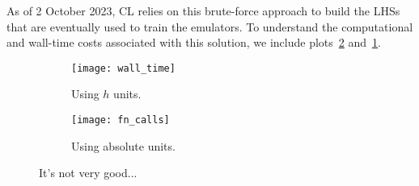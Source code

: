 \begin{comment}
The \verb|cdist| function can be re-used to compare LHSs loaded from 
different
files. However, since there is generally little reason to keep old LHSs
(except, perhaps, to reconstruct specific emulators), it reduces clutter to
simply continue overwriting the same file. Therefore, the function
\verb|multithread_unit_LHC_builder| also includes a parameter
\verb|previous_record|, which is recommended whenever the user would like to
stop the function and then resume it later. In such a case, the parameter
should be set to the \verb|cdist| value of the exis}
\end{comment}



As of 2 October 2023, CL relies on this brute-force approach to build the
LHSs that are eventually used to train the emulators. To understand the 
computational and wall-time costs associated with this solution, we include 
plots~\ref{fig: function_calls} and~\ref{fig: wall_time}.

\begin{figure}[ht!]
    \begin{subfigure}{0.45 \textwidth}
    \centering
 		\texttt{[image: wall\_time]}
 		\caption{Using $h$ units.}
 		\label{fig: wall_time}
    \end{subfigure}
    \begin{subfigure}{0.45 \textwidth}
    \centering
 		\texttt{[image: fn\_calls]}
 		\caption{Using absolute units.}
 		\label{fig: function_calls}
    \end{subfigure}
        \centering
    \caption[Efficiency of Brute-Force LHS Approach]
    		{It's not very good...}
    \label{fig: random_lhs_performance}
\end{figure}

\begin{comment} %
we left the system to run for two days. In this time, the 
largest minimum separation that we generated was approximately 0.08022.  
Recall from section sec_B1 that the theoretical best possible value for this 
setup is approximately 0.24183. It would have been more meaningful if you had 
counted the total number of function calls, but it isn’t too late to set up 
such a run. So, even after assigning a relatively large amount of compute to 
this brute force solution, we fail to obtain an LHC of even a third of the 
best minimum separation.
\end{comment} 

